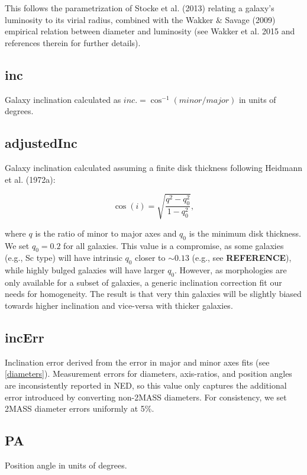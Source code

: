 \documentclass[iop]{emulateapj-rtx4}
\begin{document}
This follows the parametrization of Stocke et al. (2013) relating a galaxy's luminosity to its virial radius, combined with the Wakker $\&$ Savage (2009) empirical relation between diameter and luminosity (see Wakker et al. 2015 and references therein for further details).

\subsection{inc}
Galaxy inclination calculated as $inc. = \cos^{-1} (minor / major)$ in units of degrees.

\subsection{adjustedInc}
Galaxy inclination calculated assuming a finite disk thickness following Heidmann et al. (1972a):

\begin{equation}
	\cos(i) = \sqrt{\frac{q^2 - q_0^2}{1 - q_0^2}},
	\label{incEq}
\end{equation}

where $q$ is the ratio of minor to major axes and $q_0$ is the minimum disk thickness. We set $q_0 = 0.2$ for all galaxies. This value is a compromise, as some galaxies (e.g., Sc type) will have intrinsic $q_0$ closer to $\sim 0.13$ (e.g., see \textbf{REFERENCE}), while highly bulged galaxies will have larger $q_0$. However, as morphologies are only available for a subset of galaxies, a generic inclination correction fit our needs for homogeneity. The result is that very thin galaxies will be slightly biased towards higher inclination and vice-versa with thicker galaxies.

\subsection{incErr}
Inclination error derived from the error in major and minor axes fits (see \ref{diameters}). Measurement errors for diameters, axis-ratios, and position angles are inconsistently reported in NED, so this value only captures the additional error introduced by converting non-2MASS diameters. For consistency, we set 2MASS diameter errors uniformly at 5\%.

\subsection{PA}
Position angle in units of degrees.
\end{document}

